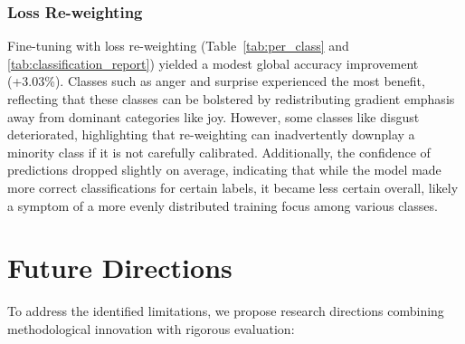 \subsubsection*{Loss Re-weighting}
Fine-tuning with loss re-weighting (Table \ref{tab:per_class} and \ref{tab:classification_report}) yielded a modest global accuracy improvement (+3.03\%). Classes such as anger and surprise experienced the most benefit, reflecting that these classes can be bolstered by redistributing gradient emphasis away from dominant categories like joy. However, some classes like disgust deteriorated, highlighting that re-weighting can inadvertently downplay a minority class if it is not carefully calibrated. Additionally, the confidence of predictions dropped slightly on average, indicating that while the model made more correct classifications for certain labels, it became less certain overall, likely a symptom of a more evenly distributed training focus among various classes.



\section{Future Directions}
To address the identified limitations, we propose research directions combining methodological innovation with rigorous evaluation:


